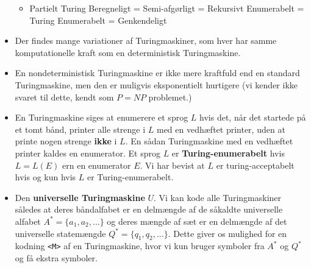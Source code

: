 \begin{itemize}
\begin{itemize}
		  \item Partielt Turing Beregneligt = Semi-afgørligt = Rekursivt Enumerabelt = Turing Enumerabelt = Genkendeligt
		\end{itemize}
  \item Der findes mange variationer af Turingmaskiner, som hver har samme komputationelle kraft som en deterministisk Turingmaskine.
  \item En nondeterministisk Turingmaskine er ikke mere kraftfuld end en standard Turingmaskine, men den er muligvis eksponentielt hurtigere (vi kender ikke svaret til dette, kendt som $P = NP$ problemet.)
  \item En Turingmaskine siges at enumerere et sprog $L$ hvis det, når det startede på et tomt bånd, printer alle strenge i $L$ med en vedhæftet printer, uden at printe nogen strenge \textbf{ikke} i $L$. En sådan Turingmaskine med en vedhæftet printer kaldes en enumerator. Et sprog $L$ er \textbf{Turing-enumerabelt} hvis $L = L(E)$ ern en enumerator $E$. Vi har bevist at $L$ er turing-acceptabelt hvis og kun hvis $L$ er Turing-enumerabelt.
  \item Den \textbf{universelle Turingmaskine} $U$. Vi kan kode alle Turingmaskiner således at deres båndalfabet er en delmængde af de såkaldte universelle alfabet $A^{*} = \{a_{1}, a_{2}, \ldots\}$ og deres mængde af sæt er en delmængde af det universelle statemængde $Q^{*} = \{q_{1}, q_{2}, \ldots\}$. Dette giver os mulighed for en kodning \texttt{<M>} af en Turingmaskine, hvor vi kun bruger symboler fra $A^{*}$ og $Q^{*}$ og få ekstra symboler.
\end{itemize}

